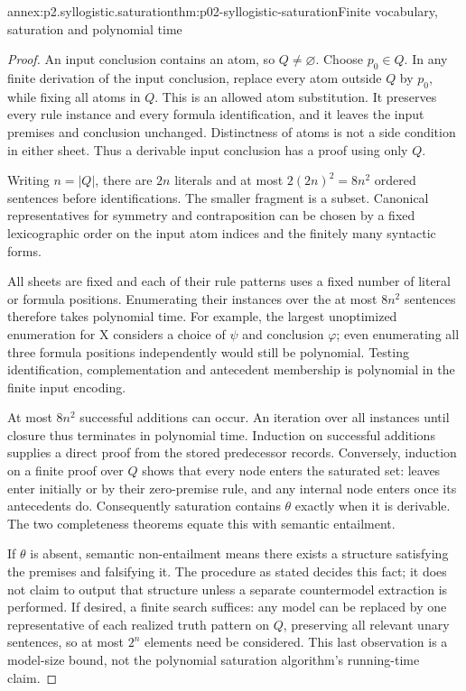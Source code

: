\begin{annexitem}{annex:p2.syllogistic.saturation}{thm:p02-syllogistic-saturation}{Finite vocabulary, saturation and polynomial time}
\begin{proof}
An input conclusion contains an atom, so \(Q\ne\varnothing\). Choose
\(p_0\in Q\). In any finite derivation of the input conclusion, replace
every atom outside \(Q\) by \(p_0\), while fixing all atoms in \(Q\).
This is an allowed atom substitution. It preserves every rule instance and
every formula identification, and it leaves the input premises and conclusion
unchanged. Distinctness of atoms is not a side condition in either sheet.
Thus a derivable input conclusion has a proof using only \(Q\).

Writing \(n=|Q|\), there are \(2n\) literals and at most
\(2(2n)^2=8n^2\) ordered sentences before identifications. The smaller
fragment is a subset. Canonical representatives for symmetry and
contraposition can be chosen by a fixed lexicographic order on the input
atom indices and the finitely many syntactic forms.

All sheets are fixed and each of their rule patterns uses a fixed number of
literal or formula positions. Enumerating their instances over the at most
\(8n^2\) sentences therefore takes polynomial time. For example, the largest
unoptimized enumeration for X considers a choice of \(\psi\) and conclusion
\(\varphi\); even enumerating all three formula positions independently
would still be polynomial. Testing identification, complementation and
antecedent membership is polynomial in the finite input encoding.

At most \(8n^2\) successful additions can occur. An iteration over all
instances until closure thus terminates in polynomial time. Induction on
successful additions supplies a direct proof from the stored predecessor
records. Conversely, induction on a finite proof over \(Q\) shows that
every node enters the saturated set: leaves enter initially or by their
zero-premise rule, and any internal node enters once its antecedents do.
Consequently saturation contains \(\theta\) exactly when it is derivable.
The two completeness theorems equate this with semantic entailment.

If \(\theta\) is absent, semantic non-entailment means there exists a
structure satisfying the premises and falsifying it. The procedure as stated
decides this fact; it does not claim to output that structure unless a separate
countermodel extraction is performed. If desired, a finite search suffices:
any model can be replaced by one representative of each realized truth pattern
on \(Q\), preserving all relevant unary sentences, so at most \(2^n\)
elements need be considered. This last observation is a model-size bound,
not the polynomial saturation algorithm's running-time claim.
\end{proof}
\end{annexitem}
